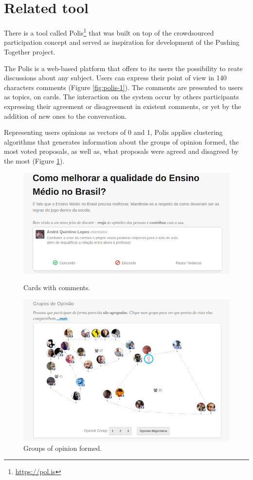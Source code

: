 \documentclass{llncs}
\begin{document}
\section{Related tool}

  There is a tool called Polis\footnote{\url{https://pol.is}} that was built
  on top of the crowdsourced participation concept and served as inspiration
  for development of the Pushing Together project.

  The Polis is a web-based platform that offers to its users the possibility to 
  reate discussions about any subject. Users can express their point of view
  in 140 characters comments (Figure \ref{fig:polis-1}). The comments are presented to users as topics,
  on cards. The interaction on the system occur by others participants expressing
  their agreement or disagreement in existent comments, or yet by the addition of
  new ones to the conversation. 

  Representing users opinions as vectors of 0 and 1, Polis applies clustering algorithms
  that generates information about the groups of opinion formed, the most voted
  proposals, as well as, what proposals were agreed and disagreed by the most (Figure \ref{fig:polis-2}). 

 \begin{figure}[hbt]
   \centering
   \begin{minipage}{.50\textwidth}
     \includegraphics[width=.9\linewidth]{images/polis1.png}
     \caption{Cards with comments.}
     \label{fig:polis-1}
   \end{minipage}
   \begin{minipage}{.49\textwidth}
     \includegraphics[width=.9\linewidth]{images/polis2.png}
     \caption{Groups of opinion formed.}
     \label{fig:polis-2}
   \end{minipage}
 \end{figure}
\end{document}
